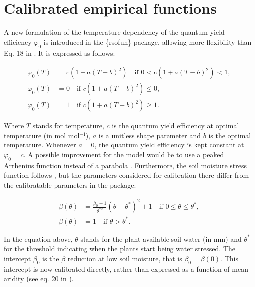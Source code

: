 \documentclass[gmd, manuscript]{copernicus}
\begin{document}
\appendix

\section{Calibrated empirical functions}    %


A new formulation of the temperature dependency of the quantum yield efficiency $\varphi_0$ is introduced in the \{rsofun\} package, allowing more flexibility than Eq. 18 in \citet{stocker2020}. It is expressed as follows:

\begin{align}
\varphi_0(T) &= c(1 + a(T - b)^2) \quad \text{if } 0 < c(1 + a(T - b)^2) < 1, \\
\varphi_0(T) &= 0 \quad \text{if } c(1 + a(T - b)^2) \leq 0, \\
\varphi_0(T) &= 1 \quad \text{if } c(1 + a(T - b)^2) \geq 1.
\end{align}

Where $T$ stands for temperature, $c$ is the quantum yield efficiency at optimal temperature (in mol mol$^{-1}$), $a$ is a unitless shape parameter and $b$ is the optimal temperature. Whenever $a = 0$, the quantum yield efficiency is kept constant at $\varphi_0 = c$. A possible improvement for the model would be to use a peaked Arrhenius function instead of a parabola \citep{medlyn2002}. Furthermore, the soil moisture stress function follows \citet{stocker2020}, but the parameters considered for calibration there differ from the calibratable parameters in the package:

\begin{align}
\beta(\theta) &= \frac{\beta_0 - 1}{\theta^{*2}}(\theta - \theta^*)^2 + 1 \quad \text{if } 0 \leq \theta \leq \theta^*, \\
\beta(\theta) &= 1 \quad \text{if } \theta > \theta^*.
\end{align}

In the equation above, $\theta$ stands for the plant-available soil water (in mm) and $\theta^*$ for the threshold indicating when the plants start being water stressed. The intercept $\beta_0$ is the $\beta$ reduction at low soil moisture, that is $\beta_0 = \beta(0)$. This intercept is now calibrated directly, rather than expressed as a function of mean aridity (see eq. 20 in \citep{stocker2020}).
\end{document}
